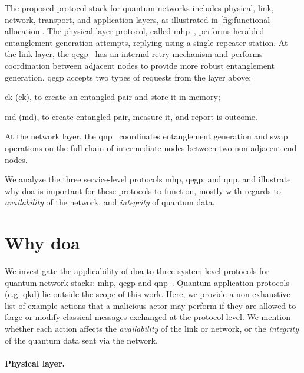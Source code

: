 The proposed protocol stack for quantum networks includes physical, link, network, transport, and
application layers, as illustrated in \cref{fig:functional-allocation}. The physical layer protocol,
called \acrfull{mhp}~\cite{dahlberg_2019_egp}, performs heralded entanglement generation attempts,
replying using a single repeater station. At the link layer, the
\acrfull{qegp}~\cite{dahlberg_2019_egp} has an internal retry mechanism and performs coordination
between adjacent nodes to provide more robust entanglement generation. \acrshort{qegp} accepts two
types of requests from the layer above:
%
\begin{inlinelist}
    \item \acrlong{ck} (\acrshort{ck}), to create an entangled pair and store it in memory;
    \item \acrlong{md} (\acrshort{md}), to create entangled pair, measure it, and report is outcome.
\end{inlinelist}
At the network layer, the \acrfull{qnp}~\cite{kozlowski_2020_qnp} coordinates entanglement
generation and swap operations on the full chain of intermediate nodes between two non-adjacent end
nodes.

We analyze the three service-level protocols \acrshort{mhp}, \acrshort{qegp}, and \acrshort{qnp},
and illustrate why \acrfull{doa} is important for these protocols to function, mostly with regards
to \emph{availability} of the network, and \emph{integrity} of quantum data.

\section{Why \acrlong{doa}}
\label{sec:doa:why}

We investigate the applicability of \acrlong{doa} to three system-level protocols for quantum
network stacks: \acrshort{mhp}, \acrshort{qegp} and \acrshort{qnp}~\cite{dahlberg_2019_egp,
kozlowski_2020_qnp}. Quantum application protocols (e.g. \acrshort{qkd}) lie outside the scope of
this work. Here, we provide a non-exhaustive list of example actions that a malicious actor may
perform if they are allowed to forge or modify classical messages exchanged at the protocol level.
We mention whether each action affects the \emph{availability} of the link or network, or the
\emph{integrity} of the quantum data sent via the network.

\paragraph*{Physical layer.}

